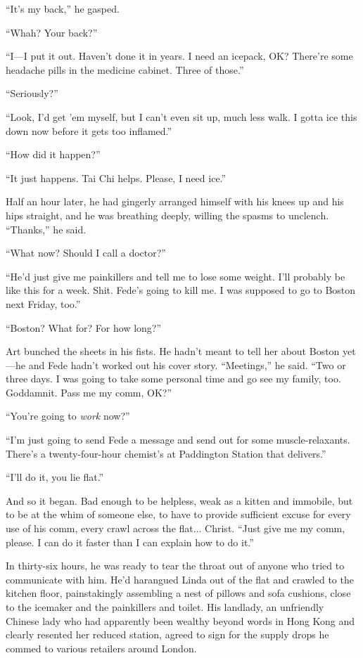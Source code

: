 “It’s my back,” he gasped.

“Whah? Your back?”

“I—I put it out. Haven’t done it in years. I need an icepack, OK?
There’re some headache pills in the medicine cabinet. Three of
those.”

“Seriously?”

“Look, I’d get ’em myself, but I can’t even sit up, much less walk.
I gotta ice this down now before it gets too inflamed.”

“How did it happen?”

“It just happens. Tai Chi helps. Please, I need ice.”

Half an hour later, he had gingerly arranged himself with his knees
up and his hips straight, and he was breathing deeply, willing the
spasms to unclench. “Thanks,” he said.

“What now? Should I call a doctor?”

“He’d just give me painkillers and tell me to lose some weight.
I’ll probably be like this for a week. Shit. Fede’s going to kill
me. I was supposed to go to Boston next Friday, too.”

“Boston? What for? For how long?”

Art bunched the sheets in his fists. He hadn’t meant to tell her
about Boston yet—he and Fede hadn’t worked out his cover story.
“Meetings,” he said. “Two or three days. I was going to take some
personal time and go see my family, too. Goddamnit. Pass me my
comm, OK?”

“You’re going to \emph{work} now?”

“I’m just going to send Fede a message and send out for some
muscle-relaxants. There’s a twenty-four-hour chemist’s at
Paddington Station that delivers.”

“I’ll do it, you lie flat.”

And so it began. Bad enough to be helpless, weak as a kitten and
immobile, but to be at the whim of someone else, to have to provide
sufficient excuse for every use of his comm, every crawl across the
flat... Christ. “Just give me my comm, please. I can do it faster
than I can explain how to do it.”

In thirty-six hours, he was ready to tear the throat out of anyone
who tried to communicate with him. He’d harangued Linda out of the
flat and crawled to the kitchen floor, painstakingly assembling a
nest of pillows and sofa cushions, close to the icemaker and the
painkillers and toilet. His landlady, an unfriendly Chinese lady
who had apparently been wealthy beyond words in Hong Kong and
clearly resented her reduced station, agreed to sign for the supply
drops he commed to various retailers around London.

